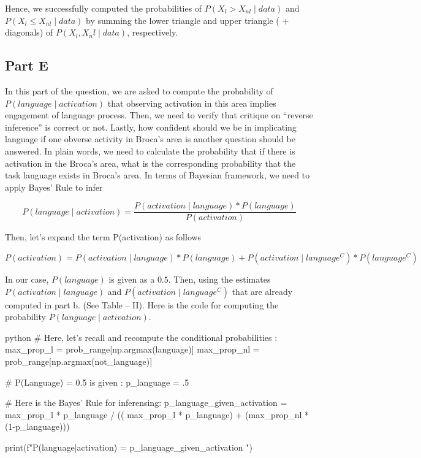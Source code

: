 \documentclass[12pt]{amsart}
\begin{document}
Hence, we successfully computed the probabilities of $P(X_l>X_{nl}\mid data)$ and $P(X_l\leq X_{nl}\mid data)$ by summing the lower triangle and upper triangle ( + diagonals) of $P(X_l,X_nl\mid data)$, respectively.

\subsection{Part E}
In this part of the question, we are asked to compute the probability of $P(language\mid activation)$ that observing activation in this area implies engagement of language process. Then, we need to verify that critique on “reverse inference” is correct or not. Lastly, how confident should we be in implicating language if one obverse activity in Broca’s area is another question should be answered. In plain words, we need to calculate the probability that if there is activation in the Broca’s area, what is the corresponding probability that the task language exists in Broca’s area. In terms of Bayesian framework, we need to apply Bayes’ Rule to infer

\begin{equation}
  P(language \mid activation) = \frac{P(activation \mid language) * P(language)}{P(activation)}
\end{equation}


Then, let’s expand the term P(activation) as follows

\begin{equation}
P(activation) =  P(activation \mid language) *P(language) +P(activation \mid language^C )*P(language^C)
\end{equation}


In our case, $P(language)$ is given as a $0.5$. Then, using the estimates $P(activation\mid language)$ and $P(activation \mid language^C )$  that are already computed in part b. (See Table – II). Here is the code for computing the probability $P(language \mid activation)$.

 \begin{mintedbox}{python}
# Here, let's recall and recompute the conditional probabilities :
max_prop_l  = prob_range[np.argmax(language)]
max_prop_nl = prob_range[np.argmax(not_language)]

# P(Language) = 0.5 is given :
p_language = .5

# Here is the Bayes' Rule for inferensing: 
p_language_given_activation = max_prop_l * p_language /
                              (( max_prop_l * p_language) + (max_prop_nl * (1-p_language)))

print(f"P(language|activation) = {p_language_given_activation} ")


\end{mintedbox}
\end{document}
